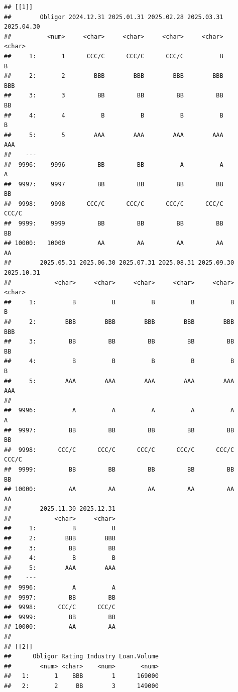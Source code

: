 \documentclass[
  11pt,
]{article}
\begin{document}
\begin{verbatim}
## [[1]]
##        Obligor 2024.12.31 2025.01.31 2025.02.28 2025.03.31 2025.04.30
##          <num>     <char>     <char>     <char>     <char>     <char>
##     1:       1      CCC/C      CCC/C      CCC/C          B          B
##     2:       2        BBB        BBB        BBB        BBB        BBB
##     3:       3         BB         BB         BB         BB         BB
##     4:       4          B          B          B          B          B
##     5:       5        AAA        AAA        AAA        AAA        AAA
##    ---                                                               
##  9996:    9996         BB         BB          A          A          A
##  9997:    9997         BB         BB         BB         BB         BB
##  9998:    9998      CCC/C      CCC/C      CCC/C      CCC/C      CCC/C
##  9999:    9999         BB         BB         BB         BB         BB
## 10000:   10000         AA         AA         AA         AA         AA
##        2025.05.31 2025.06.30 2025.07.31 2025.08.31 2025.09.30 2025.10.31
##            <char>     <char>     <char>     <char>     <char>     <char>
##     1:          B          B          B          B          B          B
##     2:        BBB        BBB        BBB        BBB        BBB        BBB
##     3:         BB         BB         BB         BB         BB         BB
##     4:          B          B          B          B          B          B
##     5:        AAA        AAA        AAA        AAA        AAA        AAA
##    ---                                                                  
##  9996:          A          A          A          A          A          A
##  9997:         BB         BB         BB         BB         BB         BB
##  9998:      CCC/C      CCC/C      CCC/C      CCC/C      CCC/C      CCC/C
##  9999:         BB         BB         BB         BB         BB         BB
## 10000:         AA         AA         AA         AA         AA         AA
##        2025.11.30 2025.12.31
##            <char>     <char>
##     1:          B          B
##     2:        BBB        BBB
##     3:         BB         BB
##     4:          B          B
##     5:        AAA        AAA
##    ---                      
##  9996:          A          A
##  9997:         BB         BB
##  9998:      CCC/C      CCC/C
##  9999:         BB         BB
## 10000:         AA         AA
## 
## [[2]]
##      Obligor Rating Industry Loan.Volume
##        <num> <char>    <num>       <num>
##   1:       1    BBB        1      169000
##   2:       2     BB        3      149000

\end{verbatim}
\end{document}
